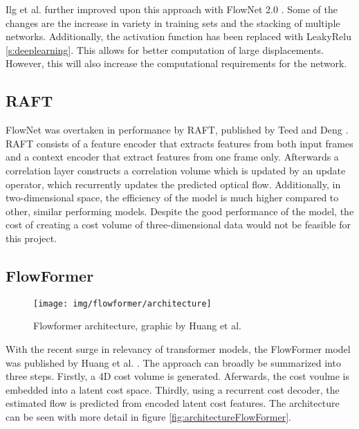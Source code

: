 Ilg et al. further improved upon this approach with FlowNet 2.0 \cite{ilgFlowNetEvolutionOptical2016}.  Some of the changes are the increase in variety in training sets and the stacking of multiple networks. Additionally, the activation function has been replaced with LeakyRelu  \eqref{s:deeplearning}. This allows for better computation of large displacements. However, this will also increase the computational requirements for the network.



\subsection{RAFT}
FlowNet was overtaken in performance by RAFT, published by Teed and Deng \cite{teedRAFTRecurrentAllPairs2020}. RAFT consists of a feature encoder that extracts features from both input frames and a context encoder that extract features from one frame only. Afterwards a correlation layer constructs a correlation volume which is updated by an update operator, which recurrently updates the predicted optical flow. Additionally, in two-dimensional space, the efficiency of the model is much higher compared to other, similar performing models. Despite the good performance of the model, the cost of creating a cost volume of three-dimensional data would not be feasible for this project.

\subsection{FlowFormer}
\begin{figure}
	\centering
	\texttt{[image: img/flowformer/architecture]}
	\caption{Flowformer architecture, graphic by  Huang et al. \cite{huangFlowFormerTransformerArchitecture2022}}
	\label{fig:architectureFlowFormer}
\end{figure}

With the recent surge in relevancy of transformer models, the FlowFormer model was published by Huang et al. \cite{huangFlowFormerTransformerArchitecture2022}. 
The approach can broadly be summarized into three steps. Firstly, a 4D cost volume is generated. Aferwards, the cost voulme is embedded into a latent cost space. Thirdly, using a recurrent cost decoder, the estimated flow is predicted from encoded latent cost features. The architecture can be seen with more detail in figure \eqref{fig:architectureFlowFormer}.

